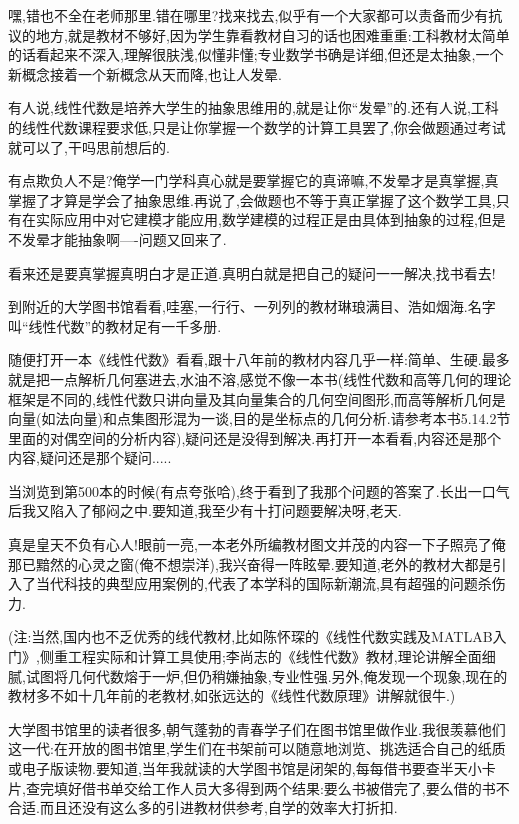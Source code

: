 嘿,错也不全在老师那里.错在哪里?找来找去,似乎有一个大家都可以责备而少有抗议的地方,就是教材不够好,因为学生靠看教材自习的话也困难重重:工科教材太简单的话看起来不深入,理解很肤浅,似懂非懂;专业数学书确是详细,但还是太抽象,一个新概念接着一个新概念从天而降,也让人发晕.

有人说,线性代数是培养大学生的抽象思维用的,就是让你``发晕''的.还有人说,工科的线性代数课程要求低,只是让你掌握一个数学的计算工具罢了,你会做题通过考试就可以了,干吗思前想后的.

有点欺负人不是?俺学一门学科真心就是要掌握它的真谛嘛,不发晕才是真掌握,真掌握了才算是学会了抽象思维.再说了,会做题也不等于真正掌握了这个数学工具,只有在实际应用中对它建模才能应用,数学建模的过程正是由具体到抽象的过程,但是不发晕才能抽象啊----问题又回来了.

看来还是要真掌握真明白才是正道.真明白就是把自己的疑问一一解决,找书看去!

到附近的大学图书馆看看,哇塞,一行行、一列列的教材琳琅满目、浩如烟海.名字叫``线性代数''的教材足有一千多册.

随便打开一本《线性代数》看看,跟十八年前的教材内容几乎一样:简单、生硬.最多就是把一点解析几何塞进去,水油不溶,感觉不像一本书(线性代数和高等几何的理论框架是不同的,线性代数只讲向量及其向量集合的几何空间图形,而高等解析几何是向量(如法向量)和点集图形混为一谈,目的是坐标点的几何分析.请参考本书5.14.2节里面的对偶空间的分析内容),疑问还是没得到解决.再打开一本看看,内容还是那个内容,疑问还是那个疑问.....

当浏览到第500本的时候(有点夸张哈),终于看到了我那个问题的答案了.长出一口气后我又陷入了郁闷之中.要知道,我至少有十打问题要解决呀,老天.

真是皇天不负有心人!眼前一亮,一本老外所编教材图文并茂的内容一下子照亮了俺那已黯然的心灵之窗(俺不想崇洋),我兴奋得一阵眩晕.要知道,老外的教材大都是引入了当代科技的典型应用案例的,代表了本学科的国际新潮流,具有超强的问题杀伤力.

(注:当然,国内也不乏优秀的线代教材,比如陈怀琛的《线性代数实践及MATLAB入门》,侧重工程实际和计算工具使用;李尚志的《线性代数》教材,理论讲解全面细腻,试图将几何代数熔于一炉,但仍稍嫌抽象,专业性强.另外,俺发现一个现象,现在的教材多不如十几年前的老教材,如张远达的《线性代数原理》讲解就很牛.)

大学图书馆里的读者很多,朝气蓬勃的青春学子们在图书馆里做作业.我很羡慕他们这一代:在开放的图书馆里,学生们在书架前可以随意地浏览、挑选适合自己的纸质或电子版读物.要知道,当年我就读的大学图书馆是闭架的,每每借书要查半天小卡片,查完填好借书单交给工作人员大多得到两个结果:要么书被借完了,要么借的书不合适.而且还没有这么多的引进教材供参考,自学的效率大打折扣.

